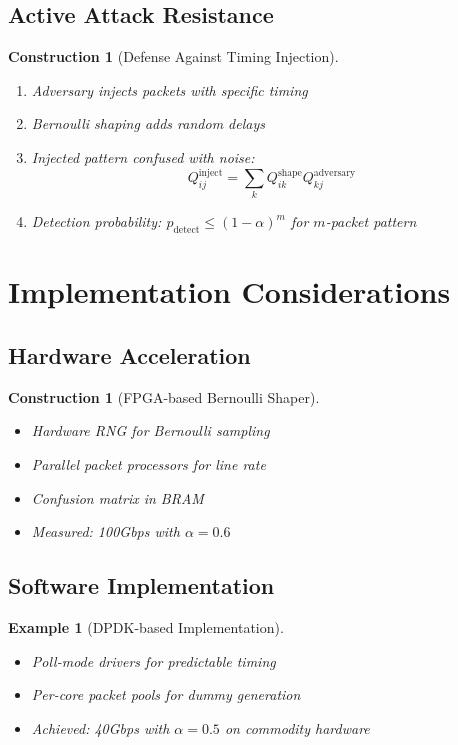 \documentclass[11pt,final]{article}
\newtheorem{example}[theorem]{Example}
\newtheorem{construction}[theorem]{Construction}
\begin{document}
\subsection{Active Attack Resistance}

\begin{construction}[Defense Against Timing Injection]
\begin{enumerate}
    \item Adversary injects packets with specific timing
    \item Bernoulli shaping adds random delays
    \item Injected pattern confused with noise:
        \begin{equation}
        Q^{\text{inject}}_{ij} = \sum_k Q^{\text{shape}}_{ik} Q^{\text{adversary}}_{kj}
        \end{equation}
    \item Detection probability: $p_{\text{detect}} \leq (1-\alpha)^m$ for $m$-packet pattern
\end{enumerate}
\end{construction}

\section{Implementation Considerations}

\subsection{Hardware Acceleration}

\begin{construction}[FPGA-based Bernoulli Shaper]
\begin{itemize}
    \item Hardware RNG for Bernoulli sampling
    \item Parallel packet processors for line rate
    \item Confusion matrix in BRAM
    \item Measured: 100Gbps with $\alpha = 0.6$
\end{itemize}
\end{construction}

\subsection{Software Implementation}

\begin{example}[DPDK-based Implementation]
\begin{itemize}
    \item Poll-mode drivers for predictable timing
    \item Per-core packet pools for dummy generation
    \item Achieved: 40Gbps with $\alpha = 0.5$ on commodity hardware
\end{itemize}
\end{example}
\end{document}

